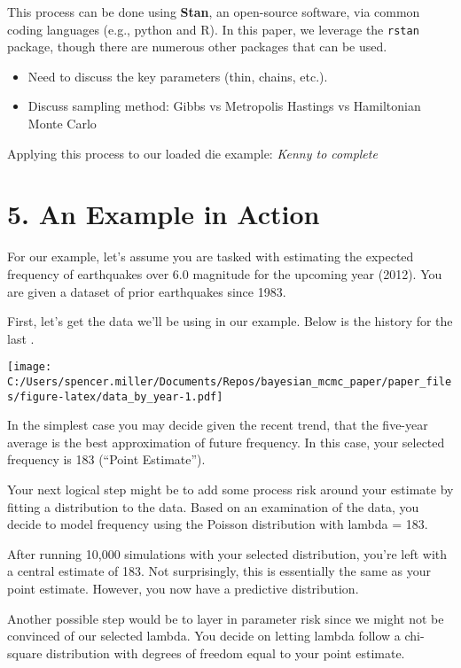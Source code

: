 \documentclass[
]{article}
\providecommand{\tightlist}{%
  \setlength{\itemsep}{0pt}\setlength{\parskip}{0pt}}
\begin{document}
This process can be done using \textbf{Stan}, an open-source software,
via common coding languages (e.g., python and R). In this paper, we
leverage the \texttt{rstan} package, though there are numerous other
packages that can be used.

\begin{itemize}
\tightlist
\item
  Need to discuss the key parameters (thin, chains, etc.).
\item
  Discuss sampling method: Gibbs vs Metropolis Hastings vs Hamiltonian
  Monte Carlo
\end{itemize}

Applying this process to our loaded die example: \emph{Kenny to
complete}

\hypertarget{an-example-in-action}{%
\section{5. An Example in Action}\label{an-example-in-action}}

For our example, let's assume you are tasked with estimating the
expected frequency of earthquakes over 6.0 magnitude for the upcoming
year (2012). You are given a dataset of prior earthquakes since 1983.

First, let's get the data we'll be using in our example. Below is the
history for the last .

\texttt{[image: C:/Users/spencer.miller/Documents/Repos/bayesian\_mcmc\_paper/paper\_files/figure-latex/data\_by\_year-1.pdf]}

In the simplest case you may decide given the recent trend, that the
five-year average is the best approximation of future frequency. In this
case, your selected frequency is 183 (``Point Estimate'').

Your next logical step might be to add some process risk around your
estimate by fitting a distribution to the data. Based on an examination
of the data, you decide to model frequency using the Poisson
distribution with lambda = 183.

After running 10,000 simulations with your selected distribution, you're
left with a central estimate of 183. Not surprisingly, this is
essentially the same as your point estimate. However, you now have a
predictive distribution.

Another possible step would be to layer in parameter risk since we might
not be convinced of our selected lambda. You decide on letting lambda
follow a chi-square distribution with degrees of freedom equal to your
point estimate.
\end{document}
